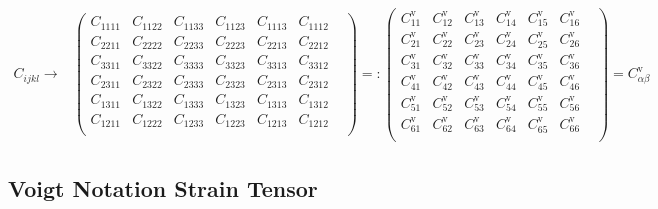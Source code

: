 \documentclass[a4paper]{scrartcl}
\begin{document}
 \begin{align} C_{ijkl} \longrightarrow& \begin{pmatrix} C_{1111} & C_{1122} &
C_{1133} & C_{1123} & C_{1113} & C_{1112} & \\ C_{2211} & C_{2222} & C_{2233} &
C_{2223} & C_{2213} & C_{2212} & \\ C_{3311} & C_{3322} & C_{3333} & C_{3323} &
C_{3313} & C_{3312} & \\ C_{2311} & C_{2322} & C_{2333} & C_{2323} & C_{2313} &
C_{2312} & \\ C_{1311} & C_{1322} & C_{1333} & C_{1323} & C_{1313} & C_{1312} &
\\ C_{1211} & C_{1222} & C_{1233} & C_{1223} & C_{1213} & C_{1212} & \\
\end{pmatrix}=: \begin{pmatrix} C_{11}^{\text{v}} & C_{12}^{\text{v}} &
C_{13}^{\text{v}} & C_{14}^{\text{v}} & C_{15}^{\text{v}} & C_{16}^{\text{v}} &
\\ C_{21}^{\text{v}} & C_{22}^{\text{v}} & C_{23}^{\text{v}} & C_{24}^{\text{v}}
&  C_{25}^{\text{v}} & C_{26}^{\text{v}} & \\ C_{31}^{\text{v}} &
C_{32}^{\text{v}}  & C_{33}^{\text{v}} & C_{34}^{\text{v}} & C_{35}^{\text{v}} &
C_{36}^{\text{v}} & \\ C_{41}^{\text{v}} & C_{42}^{\text{v}} & C_{43}^{\text{v}}
& C_{44}^{\text{v}} & C_{45}^{\text{v}} & C_{46}^{\text{v}} & \\
C_{51}^{\text{v}}  & C_{52}^{\text{v}} & C_{53}^{\text{v}} & C_{54}^{\text{v}} &
C_{55}^{\text{v}} & C_{56}^{\text{v}} & \\ C_{61}^{\text{v}} & C_{62}^{\text{v}}
& C_{63}^{\text{v}} & C_{64}^{\text{v}} & C_{65}^{\text{v}} & C_{66}^{\text{v}}
&  \\ \end{pmatrix} =C^{\text{v}}_{\alpha\beta} \end{align}

\subsection{Voigt Notation Strain Tensor}
\end{document}
